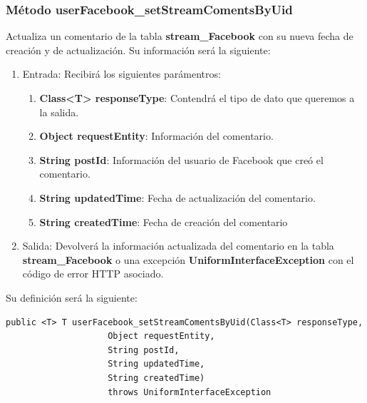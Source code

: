 \subsubsection{Método userFacebook\_setStreamComentsByUid}
Actualiza un comentario de la tabla \textbf{stream\_Facebook} con su nueva fecha de creación y de actualización. Su información será la siguiente:
\begin{enumerate}
\item Entrada: Recibirá los siguientes parámentros:
\begin{enumerate}
\item \textbf{Class<T> responseType}: Contendrá el tipo de dato que queremos a la salida. 
\item \textbf{Object requestEntity}: Información del comentario.
\item \textbf{String postId}: Información del usuario de Facebook que creó el comentario.
\item \textbf{String updatedTime}: Fecha de actualización del comentario.
\item \textbf{String createdTime}: Fecha de creación del comentario
\end{enumerate}
\item Salida: Devolverá la información actualizada del comentario en la tabla \textbf{stream\_Facebook} o una excepción \textbf{UniformInterfaceException} con el código de error HTTP asociado.
\end{enumerate}
\bigskip
\par
Su definición será la siguiente:
\begin{verbatim}public <T> T userFacebook_setStreamComentsByUid(Class<T> responseType, 
					Object requestEntity, 
					String postId, 
					String updatedTime, 
					String createdTime) 
					throws UniformInterfaceException\end{verbatim}


